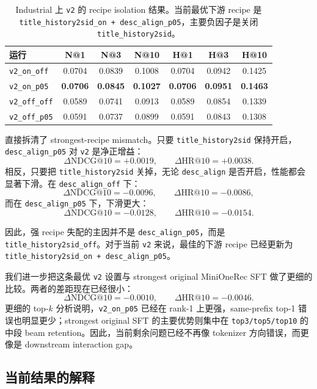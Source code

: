 \begin{table}[t]
  \centering
  \caption{Industrial 上 \texttt{v2} 的 recipe isolation 结果。当前最优下游 recipe 是 \texttt{title\_history2sid\_on + desc\_align\_p05}，主要负因子是关闭 \texttt{title\_history2sid}。}
  \label{tab:v2recipe}
  \begin{tabular}{lcccccc}
    \toprule
    运行 & N@1 & N@3 & N@10 & H@1 & H@3 & H@10 \\
    \midrule
    \texttt{v2\_on\_off} & 0.0704 & 0.0839 & 0.1008 & 0.0704 & 0.0942 & 0.1425 \\
    \texttt{v2\_on\_p05} & \textbf{0.0706} & \textbf{0.0845} & \textbf{0.1027} & \textbf{0.0706} & \textbf{0.0951} & \textbf{0.1463} \\
    \texttt{v2\_off\_off} & 0.0589 & 0.0741 & 0.0913 & 0.0589 & 0.0854 & 0.1339 \\
    \texttt{v2\_off\_p05} & 0.0591 & 0.0737 & 0.0899 & 0.0591 & 0.0843 & 0.1308 \\
    \bottomrule
  \end{tabular}
\end{table}

 直接拆清了 strongest-recipe mismatch。只要 \texttt{title\_history2sid} 保持开启，\texttt{desc\_align\_p05} 对 \texttt{v2} 是净正增益：
\[
\Delta \mathrm{NDCG}@10 = +0.0019,\qquad
\Delta \mathrm{HR}@10 = +0.0038.
\]
相反，只要把 \texttt{title\_history2sid} 关掉，无论 \texttt{desc\_align} 是否开启，性能都会显著下滑。在 \texttt{desc\_align\_off} 下：
\[
\Delta \mathrm{NDCG}@10 = -0.0096,\qquad
\Delta \mathrm{HR}@10 = -0.0086,
\]
而在 \texttt{desc\_align\_p05} 下，下滑更大：
\[
\Delta \mathrm{NDCG}@10 = -0.0128,\qquad
\Delta \mathrm{HR}@10 = -0.0154.
\]

因此，强 recipe 失配的主因并不是 \texttt{desc\_align\_p05}，而是 \texttt{title\_history2sid\_off}。对于当前 \texttt{v2} 来说，最佳的下游 recipe 已经更新为 \texttt{title\_history2sid\_on + desc\_align\_p05}。

我们进一步把这条最优 \texttt{v2} 设置与 strongest original MiniOneRec SFT 做了更细的比较。两者的差距现在已经很小：
\[
\Delta \mathrm{NDCG}@10 = -0.0010,\qquad
\Delta \mathrm{HR}@10 = -0.0046.
\]
更细的 top-$k$ 分析说明，\texttt{v2\_on\_p05} 已经在 rank-1 上更强，same-prefix top-1 错误也明显更少；strongest original SFT 的主要优势则集中在 \texttt{top3/top5/top10} 的中段 beam retention。因此，当前剩余问题已经不再像 tokenizer 方向错误，而更像是 downstream interaction gap。

\subsection{当前结果的解释}

